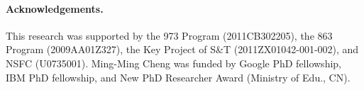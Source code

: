 \documentclass[10pt,twocolumn,letterpaper]{article}
\newcommand{\vnudge}{\vspace*{-.1in}}
\begin{document}
\vnudge
\paragraph{Acknowledgements.} This research was supported by the
973 Program (2011CB302205), the 863 Program (2009AA01Z327), the Key Project of
S\&T (2011ZX01042-001-002), and NSFC (U0735001).
Ming-Ming Cheng was funded by Google PhD fellowship, IBM PhD fellowship,
and New PhD Researcher Award (Ministry of Edu., CN).

{\small


}
\end{document}

